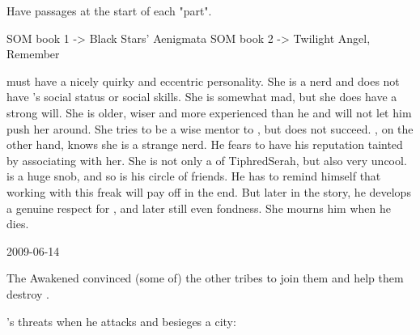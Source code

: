 Have \WanderersInDarknessEmph passages at the start of each "part".

SOM book 1 -> Black Stars' Aenigmata
SOM book 2 -> Twilight Angel, Remember

\Urizeth must have a nicely quirky and eccentric personality.
She is a nerd and does not have \Teshrial's social status or social skills.
She is somewhat mad, but she does have a strong will. 
She is older, wiser and more experienced than he and will not let him push her around.
She tries to be a wise mentor to \Teshrial, but does not succeed.
\Teshrial, on the other hand, knows she is a strange nerd.
He fears to have his reputation tainted by associating with her.
She is not only a \thelyad of TiphredSerah, but also very uncool.
\Teshrial is a huge snob, and so is his circle of friends.
He has to remind himself that working with this freak will pay off in the end.
But later in the story, he develops a genuine respect for \Urizeth, and later still even fondness.
She mourns him when he dies.



2009-06-14

The Awakened \resphain convinced (some of) the other \resphan tribes to join them and help them destroy \Merkyrah.


\Narkiza's threats when he attacks and besieges a city:

